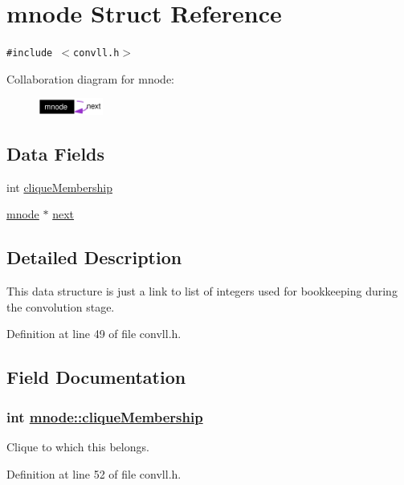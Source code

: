 \hypertarget{structmnode}{
\section{mnode Struct Reference}
\label{structmnode}
}
{\tt \#include $<$convll.h$>$}

Collaboration diagram for mnode:\begin{figure}[H]
\begin{center}
\leavevmode
\includegraphics[width=60pt]{structmnode__coll__graph}
\end{center}
\end{figure}
\subsection*{Data Fields}
\begin{CompactItemize}
\item 
int \hyperlink{structmnode_o0}{clique\-Membership}
\item 
\hyperlink{structmnode}{mnode} $\ast$ \hyperlink{structmnode_o1}{next}
\end{CompactItemize}


\subsection*{Detailed Description}
This data structure is just a link to list of integers used for bookkeeping during the convolution stage.



Definition at line 49 of file convll.h.

\subsection*{Field Documentation}
\hypertarget{structmnode_o0}{
\subsubsection[cliqueMembership]{\setlength{\rightskip}{0pt plus 5cm}int \hyperlink{structmnode_o0}{mnode::clique\-Membership}}}
\label{structmnode_o0}


Clique to which this belongs. 

Definition at line 52 of file convll.h.

